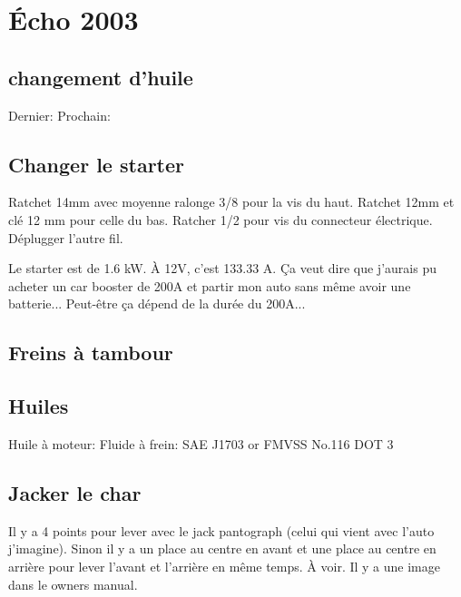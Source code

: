 \documentclass{article}
\begin{document}
\section{Écho 2003}

\subsection{changement d'huile}

Dernier:
Prochain:

\subsection{Changer le starter}

Ratchet 14mm avec moyenne ralonge 3/8 pour la vis du haut.
Ratchet 12mm et clé 12 mm pour celle du bas.
Ratcher 1/2 pour vis du connecteur électrique.
Déplugger l'autre fil.

Le starter est de 1.6 kW. À 12V, c'est 133.33 A. Ça veut dire que j'aurais pu acheter un car booster de 200A et partir mon auto sans même avoir une batterie... Peut-être ça dépend de la durée du 200A...

\subsection{Freins à tambour}

\subsection{Huiles}
Huile à moteur:
Fluide à frein: SAE J1703 or FMVSS No.116 DOT 3

\subsection{Jacker le char}

Il y a 4 points pour lever avec le jack pantograph (celui qui vient avec l'auto j'imagine). Sinon il y a un place au centre en avant et une place au centre en arrière pour lever l'avant et l'arrière en même temps. À voir. Il y a une image dans le owners manual.
\end{document}

